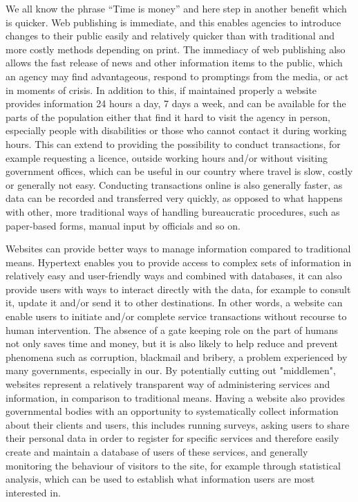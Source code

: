 We all know the phrase “Time is money” and here step in another benefit which is quicker. Web publishing is immediate, and this enables agencies to introduce changes to their public easily and relatively quicker than with traditional and more costly methods depending on print. The immediacy of web publishing also allows the fast release of news and other information items to the public, which an agency may find advantageous, respond to promptings from the media, or act in moments of crisis. In addition to this, if maintained properly a website provides information 24 hours a day, 7 days a week, and can be available for the parts of the population either that find it hard to visit the agency in person, especially people with disabilities or those who cannot contact it during working hours. This can extend to providing the possibility to conduct transactions, for example requesting a licence, outside working hours and/or without visiting government offices, which can be useful in our country where travel is slow, costly or generally not easy. Conducting transactions online is also generally faster, as data can be recorded and transferred very quickly, as opposed to what happens with other, more traditional ways of handling bureaucratic procedures, such as paper-based forms, manual input by officials and so on.

 Websites can provide better ways to manage information compared to traditional means. Hypertext enables you to provide access to complex sets of information in relatively easy and user-friendly ways and combined with databases, it can also provide users with ways to interact directly with the data, for example to consult it, update it and/or send it to other destinations. In other words, a website can enable users to initiate and/or complete service transactions without recourse to human intervention. The absence of a gate keeping role on the part of humans not only saves time and money, but it is also likely to help reduce and prevent phenomena such as corruption, blackmail and bribery, a problem experienced by many governments, especially in our. By potentially cutting out "middlemen", websites represent a relatively transparent way of administering services and information, in comparison to traditional means. Having a website also provides governmental bodies with an opportunity to systematically collect information about their clients and users, this includes running surveys, asking users to share their personal data in order to register for specific services and therefore easily create and maintain a database of users of these services, and generally monitoring the behaviour of visitors to the site, for example through statistical analysis, which can be used to establish what information users are most interested in.

